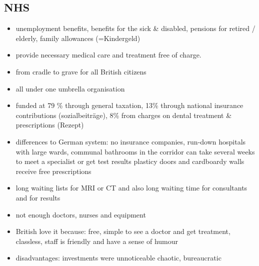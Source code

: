 \documentclass[a5paper,12pt,twoside,titlepage]{scrartcl}
\begin{document}
	\subsection{NHS}
	\begin{itemize}
		\item unemployment benefits, benefits for the sick \& disabled, pensions for retired / elderly, family allowances (=Kindergeld)
		\item provide necessary medical care and treatment free of charge. 
		\item from cradle to grave for all British citizens
		\item all under one umbrella organisation
		\item funded at 79 \% through general taxation, 13\% through national insurance contributions (sozialbeiträge), 8\% from charges on dental treatment \& prescriptions (Rezept)
		\item differences to German system: 
		\subitem no insurance companies, 
		\subitem run-down hospitals with large wards, communal bathrooms in the corridor
		\subitem can take several weeks to meet a specialist or get test results
		\subitem plasticy doors and cardboardy walls
		\subitem receive free prescriptions
		\item long waiting lists for MRI or CT
		\subitem and also long waiting time for consultants and for results
		\item not enough doctors, nurses and equipment
		\item British love it because:
		\subitem free, simple to see a doctor and get treatment, 
		\subitem classless, staff is friendly and have a sense of humour
		\item disadvantages: 
		\subitem investments were unnoticeable
		\subitem chaotic, bureaucratic
	\end{itemize}
\end{document}
